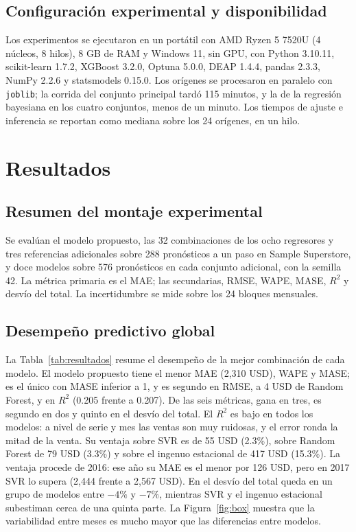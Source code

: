 \documentclass[pdflatex,sn-mathphys-num]{sn-jnl}
\theoremstyle{thmstyleone}
\begin{document}
\subsection{Configuración experimental y disponibilidad}\label{subsec:config}

Los experimentos se ejecutaron en un portátil con AMD Ryzen 5 7520U (4 núcleos, 8 hilos), 8 GB de RAM y Windows 11, sin GPU, con Python 3.10.11, scikit-learn 1.7.2, XGBoost 3.2.0, Optuna 5.0.0, DEAP 1.4.4, pandas 2.3.3, NumPy 2.2.6 y statsmodels 0.15.0. Los orígenes se procesaron en paralelo con \texttt{joblib}; la corrida del conjunto principal tardó 115 minutos, y la de la regresión bayesiana en los cuatro conjuntos, menos de un minuto. Los tiempos de ajuste e inferencia se reportan como mediana sobre los 24 orígenes, en un hilo.

\section{Resultados}\label{sec:resultados}

\subsection{Resumen del montaje experimental}\label{subsec:montaje}

Se evalúan el modelo propuesto, las 32 combinaciones de los ocho regresores y tres referencias adicionales sobre 288 pronósticos a un paso en Sample Superstore, y doce modelos sobre 576 pronósticos en cada conjunto adicional, con la semilla 42. La métrica primaria es el MAE; las secundarias, RMSE, WAPE, MASE, $R^2$ y desvío del total. La incertidumbre se mide sobre los 24 bloques mensuales.

\subsection{Desempeño predictivo global}\label{subsec:global}

La Tabla~\ref{tab:resultados} resume el desempeño de la mejor combinación de cada modelo. El modelo propuesto tiene el menor MAE (2{,}310 USD), WAPE y MASE; es el único con MASE inferior a 1, y es segundo en RMSE, a 4 USD de Random Forest, y en $R^2$ (0.205 frente a 0.207). De las seis métricas, gana en tres, es segundo en dos y quinto en el desvío del total. El $R^2$ es bajo en todos los modelos: a nivel de serie y mes las ventas son muy ruidosas, y el error ronda la mitad de la venta. Su ventaja sobre SVR es de 55 USD (2.3\%), sobre Random Forest de 79 USD (3.3\%) y sobre el ingenuo estacional de 417 USD (15.3\%). La ventaja procede de 2016: ese año su MAE es el menor por 126 USD, pero en 2017 SVR lo supera (2{,}444 frente a 2{,}567 USD). En el desvío del total queda en un grupo de modelos entre $-4\%$ y $-7\%$, mientras SVR y el ingenuo estacional subestiman cerca de una quinta parte. La Figura~\ref{fig:box} muestra que la variabilidad entre meses es mucho mayor que las diferencias entre modelos.
\end{document}
